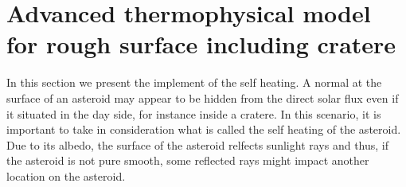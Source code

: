 \section{Advanced thermophysical model for rough surface including cratere}
\label{selfheating}

In this section we present the implement of the self heating. A normal at the surface of an asteroid may appear to be hidden from the direct solar flux even if it situated in the day side, for instance inside a cratere. In this scenario, it is important to take in consideration what is called the self heating of the asteroid. Due to its albedo, the surface of the asteroid relfects sunlight rays and thus, if the asteroid is not pure smooth, some reflected rays might impact another location on the asteroid.
